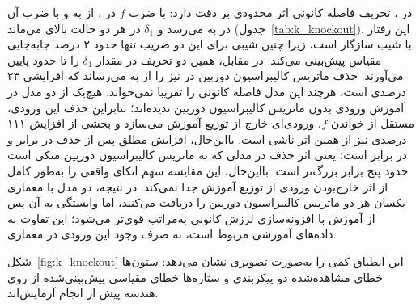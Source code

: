 در \zoomcropconfig{}، تحریف فاصله کانونی اثر محدودی بر دقت \proposedmodel{} دارد: با ضرب $f$ در ،  از  به  و با ضرب آن در  به  می‌رسد و $\delta_1$ در هر دو حالت بالای  می‌ماند (جدول~\ref{tab:k_knockout}). این رفتار با شیب  سازگار است، زیرا چنین شیبی برای این دو ضریب تنها حدود ۲ درصد جابه‌جایی مقیاس پیش‌بینی می‌کند. در مقابل، همین دو تحریف در \focaljitterconfig{} مقدار $\delta_1$ را تا حدود  پایین می‌آورند. حذف ماتریس کالیبراسیون دوربین در \zoomcropconfig{} نیز  را از  به  می‌رساند که افزایشی ۲۳ درصدی است، هرچند این مدل فاصله کانونی را تقریبا نمی‌خواند. هیچ‌یک از دو مدل در آموزش ورودی بدون ماتریس کالیبراسیون دوربین ندیده‌اند؛ بنابراین حذف این ورودی، مستقل از خواندن $f$، ورودی‌ای خارج از توزیع آموزش می‌سازد و بخشی از افزایش ۱۱۱ درصدی \focaljitterconfig{} نیز از همین اثر ناشی است. بااین‌حال، افزایش مطلق  پس از حذف در \focaljitterconfig{} برابر  و در \zoomcropconfig{} برابر  است؛ یعنی اثر حذف در مدلی که به ماتریس کالیبراسیون دوربین متکی است حدود پنج برابر بزرگ‌تر است. بااین‌حال، این مقایسه سهم اتکای واقعی را به‌طور کامل از اثر خارج‌بودن ورودی از توزیع آموزش جدا نمی‌کند. در نتیجه، دو مدل با معماری یکسان هر دو ماتریس کالیبراسیون دوربین را دریافت می‌کنند، اما وابستگی به آن پس از آموزش با افزونه‌سازی لرزش کانونی به‌مراتب قوی‌تر می‌شود؛ این تفاوت به داده‌های آموزشی مربوط است، نه صرف وجود این ورودی در معماری.

شکل~\ref{fig:k_knockout} این انطباق کمی را به‌صورت تصویری نشان می‌دهد:
ستون‌ها خطای مشاهده‌شده دو پیکربندی و ستاره‌ها خطای مقیاسی پیش‌بینی‌شده \focaljitterconfig{} از روی
هندسه پیش از انجام آزمایش‌اند.

